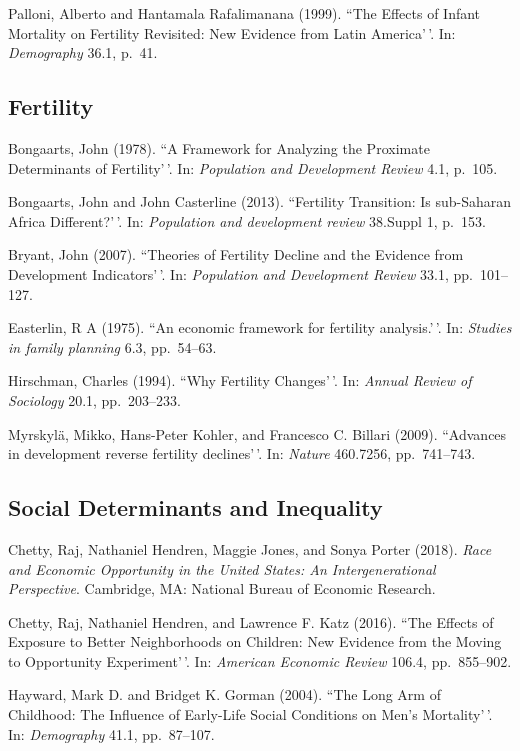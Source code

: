 \documentclass[11pt,]{article}
\begin{document}
Palloni, Alberto and Hantamala Rafalimanana (1999). ``The Effects of
Infant Mortality on Fertility Revisited: New Evidence from Latin
America'\,'. In: \emph{Demography} 36.1, p.~41.

\hypertarget{fertility}{%
\subsection{Fertility}\label{fertility}}

Bongaarts, John (1978). ``A Framework for Analyzing the Proximate
Determinants of Fertility'\,'. In:
\emph{Population and Development Review} 4.1, p.~105.

Bongaarts, John and John Casterline (2013). ``Fertility Transition: Is
sub-Saharan Africa Different?'\,'. In:
\emph{Population and development review} 38.Suppl 1, p.~153.

Bryant, John (2007). ``Theories of Fertility Decline and the Evidence
from Development Indicators'\,'. In:
\emph{Population and Development Review} 33.1, pp.~101--127.

Easterlin, R A (1975). ``An economic framework for fertility
analysis.'\,'. In: \emph{Studies in family planning} 6.3, pp.~54--63.

Hirschman, Charles (1994). ``Why Fertility Changes'\,'. In:
\emph{Annual Review of Sociology} 20.1, pp.~203--233.

Myrskylä, Mikko, Hans-Peter Kohler, and Francesco C. Billari (2009).
``Advances in development reverse fertility declines'\,'. In:
\emph{Nature} 460.7256, pp.~741--743.

\hypertarget{social-determinants-and-inequality}{%
\subsection{Social Determinants and
Inequality}\label{social-determinants-and-inequality}}

Chetty, Raj, Nathaniel Hendren, Maggie Jones, and Sonya Porter (2018).
\emph{Race and Economic Opportunity in the United States: An Intergenerational Perspective}.
Cambridge, MA: National Bureau of Economic Research.

Chetty, Raj, Nathaniel Hendren, and Lawrence F. Katz (2016). ``The
Effects of Exposure to Better Neighborhoods on Children: New Evidence
from the Moving to Opportunity Experiment'\,'. In:
\emph{American Economic Review} 106.4, pp.~855--902.

Hayward, Mark D. and Bridget K. Gorman (2004). ``The Long Arm of
Childhood: The Influence of Early-Life Social Conditions on Men's
Mortality'\,'. In: \emph{Demography} 41.1, pp.~87--107.
\end{document}
